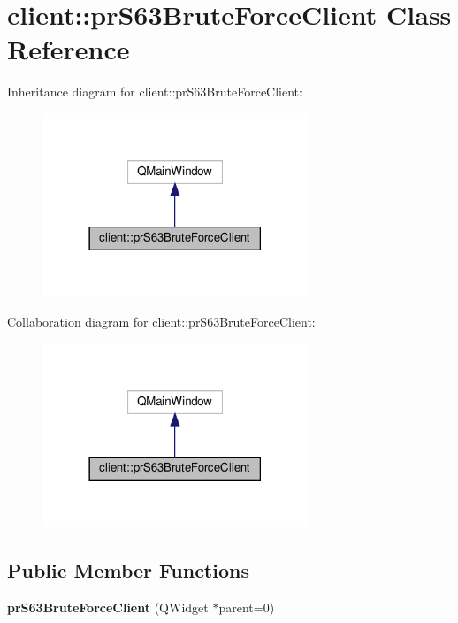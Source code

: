 \hypertarget{classclient_1_1pr_s63_brute_force_client}{}\section{client\+:\+:pr\+S63\+Brute\+Force\+Client Class Reference}
\label{classclient_1_1pr_s63_brute_force_client}


Inheritance diagram for client\+:\+:pr\+S63\+Brute\+Force\+Client\+:\nopagebreak
\begin{figure}[H]
\begin{center}
\leavevmode
\includegraphics[width=225pt]{classclient_1_1pr_s63_brute_force_client__inherit__graph}
\end{center}
\end{figure}


Collaboration diagram for client\+:\+:pr\+S63\+Brute\+Force\+Client\+:\nopagebreak
\begin{figure}[H]
\begin{center}
\leavevmode
\includegraphics[width=225pt]{classclient_1_1pr_s63_brute_force_client__coll__graph}
\end{center}
\end{figure}
\subsection*{Public Member Functions}
\begin{DoxyCompactItemize}
\item 
\mbox{\label{classclient_1_1pr_s63_brute_force_client_afa4597562e1bc7baa938d6fb29989d25}} 
{\bfseries pr\+S63\+Brute\+Force\+Client} (Q\+Widget $\ast$parent=0)
\end{DoxyCompactItemize}


